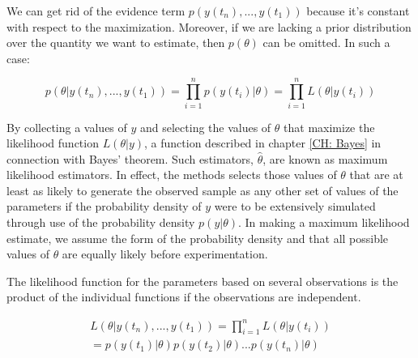 \documentclass[../Article_Model_Parameters.tex]{subfiles}
\begin{document}
We can get rid of the evidence term $p\left( y(t_n),...,y(t_1) \right)$ because it's constant with respect to the maximization. Moreover, if we are lacking a prior distribution over the quantity we want to estimate, then $p(\theta)$ can be omitted. In such a case:

{\footnotesize
	\begin{equation}
		p\left( \theta| y(t_n),...,y(t_1) \right) = \prod_{i=1}^{n} p\left( y(t_i)|\theta \right) = \prod_{i=1}^{n} L\left( \theta|y(t_i) \right) 
\end{equation} }

By collecting a values of $y$ and selecting the values of $\theta$ that maximize the likelihood function $L\left( \theta | y \right)$, a function described in chapter \ref{CH: Bayes} in connection with Bayes' theorem. Such estimators, $\hat{\theta}$, are known as maximum likelihood estimators. In effect, the methods selects those values of $\theta$ that are at least as likely to generate the observed sample as any other set of values of the parameters if the probability density of $y$ were to be extensively simulated through use of the probability density $p\left( y|\theta \right)$. In making a maximum likelihood estimate, we assume the form of the probability density and that all possible values of $\theta$ are equally likely before experimentation. 

%
		The likelihood function for the parameters based on several observations is the product of the individual functions if the observations are independent.
		
		{\footnotesize 
			\begin{multline}
				L\left( \theta|y(t_n),...,y(t_1) \right) = \prod_{i=1}^{n} L\left( \theta|y(t_i) \right) \\
				= p\left( y(t_1)| \theta \right)p\left( y(t_2)| \theta \right) ... p\left( y(t_n)| \theta \right)
		\end{multline} }
		
\end{document}
